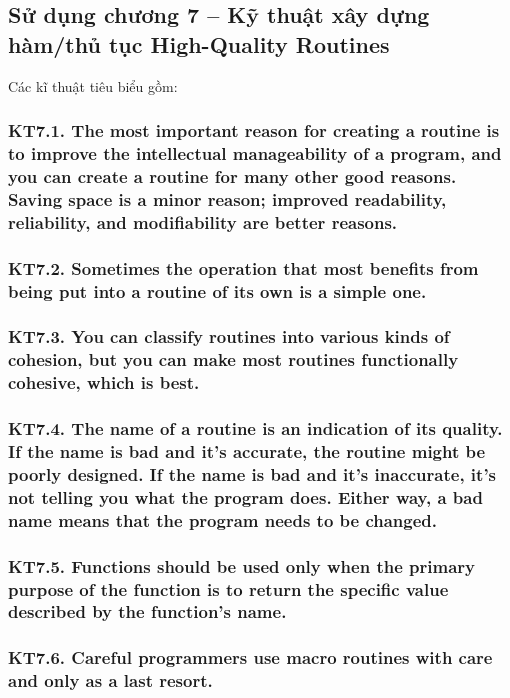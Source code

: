 \documentclass[12pt]{report}
\begin{document}
\subsection{Sử dụng chương 7 – Kỹ thuật xây dựng hàm/thủ tục High-Quality Routines}
\noindent Các kĩ thuật tiêu biểu gồm:

\subsubsection{KT7.1. The most important reason for creating a routine is to improve the intellectual manageability of a program, and you can create a routine for many other good reasons. Saving space is a minor reason; improved readability, reliability, and modifiability are better reasons.}

\subsubsection{KT7.2. Sometimes the operation that most benefits from being put into a routine of its own is a simple one.}

\subsubsection{KT7.3. You can classify routines into various kinds of cohesion, but you can make most routines functionally cohesive, which is best.}

\subsubsection{KT7.4. The name of a routine is an indication of its quality. If the name is bad and it's accurate, the routine might be poorly designed. If the name is bad and it's inaccurate, it's not telling you what the program does. Either way, a bad name means that the program needs to be changed.}

\subsubsection{KT7.5. Functions should be used only when the primary purpose of the function is to return the specific value described by the function's name.}

\subsubsection{KT7.6. Careful programmers use macro routines with care and only as a last resort.}
\end{document}
